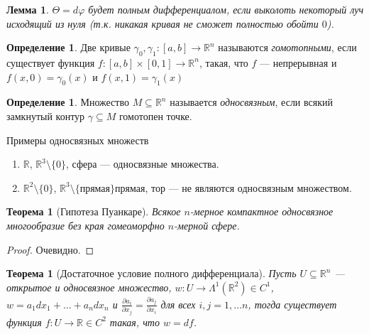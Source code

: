 \documentclass[a5paper]{article}
\newcounter{through}
\theoremstyle{plain}
\newtheorem{theorem}[through]{Теорема}
\newtheorem{lemma}[through]{Лемма}
\theoremstyle{definition}
\newtheorem{definition}[through]{Определение}
\numberwithin{through}{section}
\numberwithin{equation}{section}
\begin{document}
\begin{lemma}
	$\Theta = d \varphi$ будет полным дифференциалом, если выколоть некоторый луч исходящий из нуля (т.к. никакая кривая не сможет полностью обойти $0$).
\end{lemma}

\begin{definition}
	Две кривые $\gamma_0, \gamma_1 : [a, b] \to \mathbb{R}^n$ называются \textit{гомотопными}, если существует функция $f : [a, b] \times [0, 1] \to \mathbb{R}^n$, такая, что $f$ --- непрерывная и $f(x, 0) = \gamma_0(x)$ и $f(x, 1) = \gamma_1(x)$
\end{definition}

\begin{definition}
	Множество $M \subseteq \mathbb{R}^n$ называется \textit{односвязным}, если всякий замкнутый контур $\gamma \subseteq M$ гомотопен точке.
\end{definition}

Примеры односвязных множеств

\begin{enumerate}
	\item $\mathbb{R}$, $\mathbb{R}^3 \setminus \{0\}$, сфера --- односвязные множества.
	
	\item $\mathbb{R}^2 \setminus \{0\}$, $\mathbb{R}^3 \setminus \{\text{прямая}\} прямая$, тор --- не являются односвязным множеством.
\end{enumerate}

\begin{theorem}[Гипотеза Пуанкаре]
	Всякое $n$-мерное компактное односвязное многообразие без края гомеоморфно $n$-мерной сфере.
\end{theorem}

\begin{proof}
	Очевидно.
\end{proof}


\begin{theorem}[Достаточное условие полного дифференциала]
	
	Пусть $U \subseteq \mathbb{R}^n$ --- открытое и односвязное множество, 
	$w: U \to \Lambda^1(\mathbb{R}^2) \in C^1$, $w = a_1 dx_1 + \ldots + a_n dx_n $ 
	и $\frac{\partial a_i}{\partial x_j} = \frac{\partial a_j}{\partial x_i}$
	для всех $i, j = 1, \ldots n$, тогда существует функция $f: U \to \mathbb{R} \in C^2$ 
	такая, что $w = df$.
	
\end{theorem}
\end{document}
